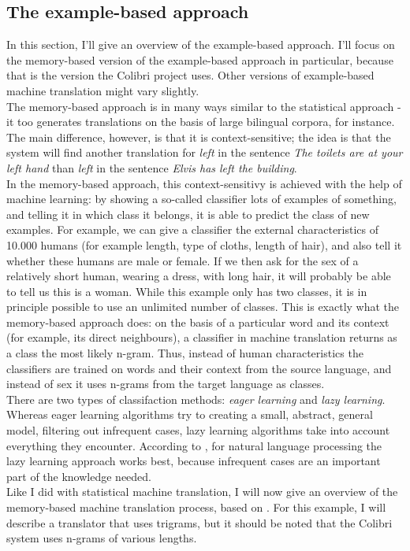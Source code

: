 \documentclass[12pt]{article}
\begin{document}
\subsection{The example-based approach}

In this section, I'll give an overview of the example-based approach. I'll focus on the memory-based version of the example-based approach in particular, because that is the version the Colibri project uses. Other versions of example-based machine translation might vary slightly. \\\indent
The memory-based approach is in many ways similar to the statistical approach - it too generates translations on the basis of large bilingual corpora, for instance. The main difference, however, is that it is context-sensitive; the idea is that the system will find another translation for \emph{left} in the sentence \emph{The toilets are at your left hand} than \emph{left} in the sentence \emph{Elvis has left the building}. \\\indent
In the memory-based approach, this context-sensitivy is achieved with the help of machine learning: by showing a so-called classifier lots of examples of something, and telling it in which class it belongs, it is able to predict the class of new examples. For example, we can give a classifier the external characteristics of 10.000 humans (for example length, type of cloths, length of hair), and also tell it whether these humans are male or female. If we then ask for the sex of a relatively short human, wearing a dress, with long hair, it will probably be able to tell us this is a woman. While this example only has two classes, it is in principle possible to use an unlimited number of classes. This is exactly what the memory-based approach does: on the basis of a particular word and its context (for example, its direct neighbours), a classifier in machine translation returns as a class the most likely n-gram. Thus, instead of human characteristics the classifiers are trained on words and their context from the source language, and instead of sex it uses n-grams from the target language as classes. \\\indent
There are two types of classifaction methods: \emph{eager learning} and \emph{lazy learning}. Whereas eager learning algorithms try to creating a small, abstract, general model, filtering out infrequent cases, lazy learning algorithms take into account everything they encounter. According to \citet{dvdb05}, for natural language processing the lazy learning approach works best, because infrequent cases are an important part of the knowledge needed. \\\indent
Like I did with statistical machine translation, I will now give an overview of the memory-based machine translation process, based on \citet{vdbb09}. For this example, I will describe a translator that uses trigrams, but it should be noted that the Colibri system uses n-grams of various lengths.
\end{document}

